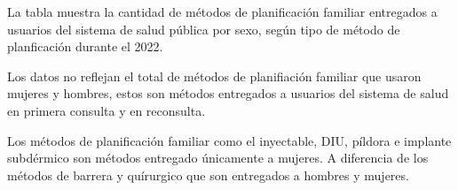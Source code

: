 La tabla muestra la cantidad de métodos de planificación familiar entregados a usuarios del sistema de salud pública por sexo, según tipo de método de planficación durante el 2022. 

Los datos no reflejan el total de métodos de planifiación familiar que usaron mujeres y hombres, estos son métodos entregados a usuarios del sistema de salud en primera consulta y en reconsulta. 

Los métodos de planificación familiar como el inyectable, DIU, píldora e implante subdérmico son métodos entregado únicamente a mujeres. A diferencia de los métodos de barrera y quírurgico que son entregados a hombres y mujeres. 